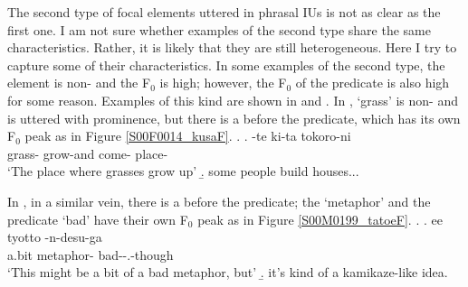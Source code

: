 The second type of focal elements uttered in phrasal IUs is not as clear as the first one.
I am not sure whether examples of the second type share the same characteristics.
Rather, it is likely that they are still heterogeneous.
Here I try to capture some of their characteristics.
In some examples of the second type,
the element is non- and the F$_{0}$ is high;
however, the F$_{0}$ of the predicate is also high for some reason.
Examples of this kind are shown in \Next and \NNext.
In \Next,  `grass' is non- and is uttered with prominence,
but there is a  before the predicate, which has its own F$_{0}$ peak as in Figure \ref{S00F0014_kusaF}.
%
\largerpage
\ex.\label{S00F0014_kusa}
 \ag.  \tp{\dvline} -te ki-ta \tp{\dvline} tokoro-ni \tp{\dvline} \\
 		grass- {} grow-and come- {} place- {} \\
		`The place where grasses grow up'
 \b. some people build houses...

In \Next,
in a similar vein,
there is a  before the predicate;
the   `metaphor' and the predicate  `bad' have their own F$_{0}$ peak as in Figure \ref{S00M0199_tatoeF}.
%
\ex.\label{S00M0199_tatoe}
 \ag. ee tyotto \tp{\dvline}  \tp{\dvline} -n-desu-ga \tp{\dvline} \\
 		 a.bit {} metaphor- {} bad--.-though {} \\
		`This might be a bit of a bad metaphor, but'
 \b. it's kind of a kamikaze-like idea.


